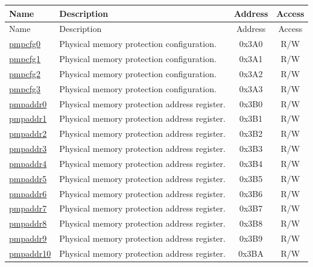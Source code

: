 
\begin{longtable}{ | p{4.0cm} | p{8.4cm} | c | c| }
\hline\rowcolor{lightgray}
Name & Description & Address & Access \\ \hline
\endfirsthead
\hline
\rowcolor{lightgray}
Name & Description & Address & Access  \\
\hline
\endhead
\endfoot

\hyperref[sec:riscvcpu-pmp-reg-desc]{pmpcfg0} & Physical memory protection configuration. & 0x3A0 & R/W \\\hline
\hyperref[sec:riscvcpu-pmp-reg-desc]{pmpcfg1} & Physical memory protection configuration. & 0x3A1 & R/W \\\hline
\hyperref[sec:riscvcpu-pmp-reg-desc]{pmpcfg2} & Physical memory protection configuration. & 0x3A2 & R/W \\\hline
\hyperref[sec:riscvcpu-pmp-reg-desc]{pmpcfg3} & Physical memory protection configuration. & 0x3A3 & R/W \\\hline
\hyperref[sec:riscvcpu-pmp-reg-desc]{pmpaddr0} & Physical memory protection address register. & 0x3B0 & R/W \\\hline
\hyperref[sec:riscvcpu-pmp-reg-desc]{pmpaddr1} & Physical memory protection address register. & 0x3B1 & R/W \\\hline
\hyperref[sec:riscvcpu-pmp-reg-desc]{pmpaddr2} & Physical memory protection address register. & 0x3B2 & R/W \\\hline
\hyperref[sec:riscvcpu-pmp-reg-desc]{pmpaddr3} & Physical memory protection address register. & 0x3B3 & R/W \\\hline
\hyperref[sec:riscvcpu-pmp-reg-desc]{pmpaddr4} & Physical memory protection address register. & 0x3B4 & R/W \\\hline
\hyperref[sec:riscvcpu-pmp-reg-desc]{pmpaddr5} & Physical memory protection address register. & 0x3B5 & R/W \\\hline
\hyperref[sec:riscvcpu-pmp-reg-desc]{pmpaddr6} & Physical memory protection address register. & 0x3B6 & R/W \\\hline
\hyperref[sec:riscvcpu-pmp-reg-desc]{pmpaddr7} & Physical memory protection address register. & 0x3B7 & R/W \\\hline
\hyperref[sec:riscvcpu-pmp-reg-desc]{pmpaddr8} & Physical memory protection address register. & 0x3B8 & R/W \\\hline
\hyperref[sec:riscvcpu-pmp-reg-desc]{pmpaddr9} & Physical memory protection address register. & 0x3B9 & R/W \\\hline
\hyperref[sec:riscvcpu-pmp-reg-desc]{pmpaddr10} & Physical memory protection address register. & 0x3BA & R/W \\\hline

\end{longtable}

